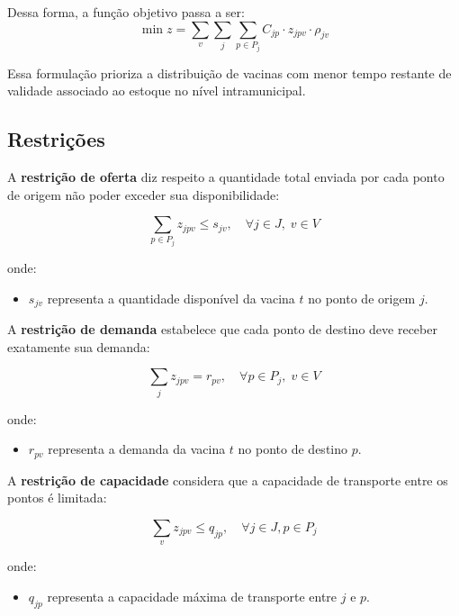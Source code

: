 Dessa forma, a função objetivo passa a ser:
\begin{equation}
\min z = \sum_{v} \sum_{j} \sum_{p \in P_j} C_{jp} \cdot z_{jpv} \cdot \rho_{jv}
\label{intramunicipal_com_penalidade}
\end{equation}

Essa formulação prioriza a distribuição de vacinas com menor tempo restante de validade associado ao estoque no nível intramunicipal.

\subsection{Restrições}

A \textbf{restrição de oferta} diz respeito a quantidade total enviada por cada ponto de origem não poder exceder sua disponibilidade:

\begin{equation*}
\sum_{p \in P_j} z_{jpv} \le s_{jv}, \quad \forall j \in J, \; v \in V
\end{equation*}

onde:
\begin{itemize}
    \item $s_{jv}$ representa a quantidade disponível da vacina $t$ no ponto de origem $j$.
\end{itemize}

A \textbf{restrição de demanda} estabelece que cada ponto de destino deve receber exatamente sua demanda:

\begin{equation*}
\sum_{j} z_{jpv} = r_{pv}, \quad \forall p \in P_j, \; v \in V
\end{equation*}

onde:
\begin{itemize}
    \item $r_{pv}$ representa a demanda da vacina $t$ no ponto de destino $p$.
\end{itemize}

A \textbf{restrição de capacidade} considera que a capacidade de transporte entre os pontos é limitada:

\begin{equation*}
\sum_{v} z_{jpv} \le q_{jp}, \quad \forall j \in J, p \in P_j
\end{equation*}

onde:
\begin{itemize}
    \item $q_{jp}$ representa a capacidade máxima de transporte entre $j$ e $p$.
\end{itemize}

